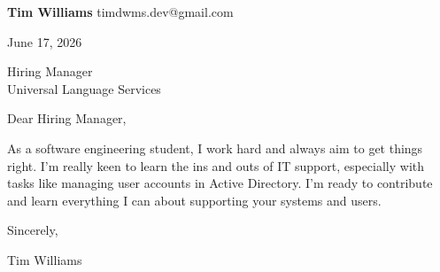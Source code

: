 \documentclass[12pt]{article}
\begin{document}
\textbf{Tim Williams} \hfill timdwms.dev@gmail.com

\vspace{1em}

June 17, 2026

\vspace{1em}

Hiring Manager \\
Universal Language Services

\vspace{1em}

Dear Hiring Manager,

As a software engineering student, I work hard and always aim to get things right. I'm really keen to learn the ins and outs of IT support, especially with tasks like managing user accounts in Active Directory. I’m ready to contribute and learn everything I can about supporting your systems and users.

\vspace{1em}

Sincerely,

\vspace{2em}

Tim Williams
\end{document}
